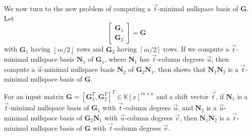 We now turn to the new problem of computing a $\vec{t}$-minimal nullspace
basis of $\mathbf{G}$. Let 
\[
\left[\begin{array}{c}
\mathbf{G}_{1}\\
\mathbf{G}_{2}
\end{array}\right]=\mathbf{G}
\]
 with $\mathbf{G}_{1}$ having $\left\lfloor m/2\right\rfloor $ rows
and $\mathbf{G}_{2}$ having $\left\lceil m/2\right\rceil $ rows.
If we compute a $\vec{t}$-minimal nullspace basis $\mathbf{N}_{1}$
of $\mathbf{G}_{1}$, where $\mathbf{N}_{1}$ has $\vec{t}$-column
degrees $\vec{u}$, then compute a $\vec{u}$-minimal nullspace basis
$\mathbf{N}_{2}$ of $\mathbf{G}_{2}\mathbf{N}_{1}$, then 
shows that $\mathbf{N}_{1}\mathbf{N}_{2}$ is a $\vec{t}$-minimal
nullspace basis of $\mathbf{G}$. 
\begin{lem}
\label{lem:continueComputingNullspaceBasisByRows}For an input matrix
$\mathbf{G}=\left[\mathbf{G}_{1}^{T},\mathbf{G}_{2}^{T}\right]^{T}\in\mathbb{K}\left[x\right]^{m\times n}$
and a shift vector $\vec{t}$, if $\mathbf{N}_{1}$ is a $\vec{t}$-minimal
nullspace basis of $\mathbf{G}_{1}$ with $\vec{t}$-column degrees
$\vec{u}$, and $\mathbf{N}_{2}$ is a $\vec{u}$-minimal nullspace
basis of $\mathbf{G}_{2}\mathbf{N}_{1}$ with $\vec{u}$-column degrees
$\vec{v}$, then $\mathbf{N}_{1}\mathbf{N}_{2}$ is a $\vec{t}$-minimal
nullspace basis of $\mathbf{G}$ with $\vec{t}$-column degrees $\vec{v}$.\end{lem}
